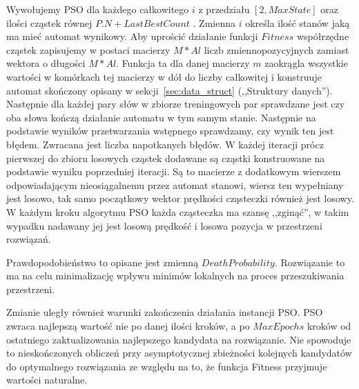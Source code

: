 \documentclass{../llncs_template/llncs}
\begin{document}
Wywołujemy PSO dla każdego całkowitego $i$ z przedziału $[2, MaxState]$ oraz ilości cząstek równej $P.N + LastBestCount$ . Zmienna $i$ określa ilość stanów jaką ma mieć automat wynikowy. Aby uprościć działanie funkcji $Fitness$ współrzędne cząstek zapisujemy w postaci macierzy $M * Al$ liczb zmiennopozycyjnych zamiast wektora o długości $M*Al$. Funkcja ta dla danej macierzy $m$ zaokrągla wszystkie wartości w komórkach tej macierzy w dół do liczby całkowitej i konstruuje automat skończony opisany w sekcji~\ref{sec:data_struct} (,,Struktury danych''). Następnie dla każdej pary słów w zbiorze treningowych par sprawdzane jest czy oba słowa kończą działanie automatu w tym samym stanie. Następnie na podstawie wyników przetwarzania wstępnego sprawdzamy, czy wynik ten jest błędem. Zwracana jest liczba napotkanych błędów. W każdej iteracji prócz pierwszej do zbioru losowych cząstek dodawane są cząstki konstruowane na podstawie wyniku poprzedniej iteracji. Są to macierze z dodatkowym wierszem odpowiadającym nieosiągalnemu przez automat stanowi, wiersz ten wypełniany jest losowo, tak samo początkowy wektor prędkości cząsteczki również jest losowy. W każdym kroku algorytmu PSO każda cząsteczka ma szansę ,,zginąć'', w takim wypadku nadawany jej jest losową prędkość i losowa pozycja w przestrzeni rozwiązań.

Prawdopodobieństwo to opisane jest zmienną $DeathProbability$. Rozwiązanie to ma na celu minimalizację wpływu minimów lokalnych na proces przeszukiwania przestrzeni.

Zmianie uległy również warunki zakończenia działania instancji PSO. PSO zwraca najlepszą wartość nie po danej ilości kroków, a po $MaxEpochs$ kroków od ostatniego zaktualizowania najlepszego kandydata na rozwiązanie. Nie spowoduje to nieskończonych obliczeń przy asymptotycznej zbieżności kolejnych kandydatów do optymalnego rozwiązania ze względu na to, że funkcja Fitness przyjmuje wartości naturalne.
\end{document}
